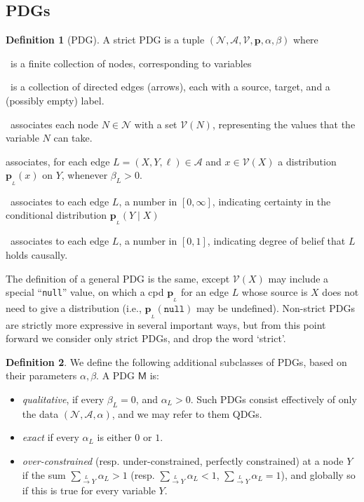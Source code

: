 \documentclass{article}
\newcommand{\bp}[1][L]{\mathbf{p}_{\!_#1\!}}
\newcommand{\V}{\mathcal V}
\newcommand{\N}{\mathcal N}
\newcommand{\Ed}{\mathcal A}
\newcommand{\dg}[1]{\mathsf #1}
\newcommand\mat[1]{\mathbf #1}
\theoremstyle{plain}
\theoremstyle{definition}
\newtheorem{defn}{Definition}
\theoremstyle{remark}
\begin{document}
\subsection{PDGs}
	\def\mnvars[#1]{(\N#1, \Ed#1, \V#1, \mat p#1, \alpha#1,\beta#1)}
	\begin{defn}[PDG]\label{def:model}
	A strict PDG is a tuple $\mnvars[]$ where
	\begin{description}[nosep]
		\item[$\N$]~is a finite collection of nodes, corresponding to variables
		\item[$\Ed$]~is a collection of directed edges (arrows), each with a source, target, and a (possibly empty) label.
		\item[$\V$]~associates each node $N \in \N$ with a set $\V(N)$,
		representing the values that the variable $N$ can take. 
		\item[$\mathbf p$] associates, for each edge $L = (X,Y, \ell) \in \Ed$ and $x \in \V(X)$ a distribution $\bp(x)$ on $Y$, whenever $\beta_L > 0$.
		\item[$\beta$]~associates to each edge $L$, a number in $[0,\infty]$, indicating certainty in the conditional distribution $\bp(Y \mid X)$ 
		\item[$\alpha$]~associates to each edge $L$, a number in $[0,1]$, indicating degree of belief that $L$ holds causally.
\end{description}
\end{defn}

The definition of a general PDG is the same, except $\mathcal V(X)$ may include a special ``\texttt{null}'' value, on which a cpd $\bp$ for an edge $L$ whose source is $X$ does not need to give a distribution (i.e., $\bp(\texttt{null})$ may be undefined). Non-strict PDGs are strictly more expressive in several important ways, but from this point forward we consider only strict PDGs, and drop the word `strict'.


\begin{defn}
	We define the following additional subclasses of PDGs, based on their parameters $\alpha, \beta$. A PDG $\dg M$ is:
	\begin{itemize}[nosep]
		\item \emph{qualitative}, if every $\beta_L = 0$, and $\alpha_L > 0$. Such PDGs consist effectively of only the data $(\N, \Ed, \alpha)$, and we may refer to them QDGs.
		\item \emph{exact} if every $\alpha_L$ is either $0$ or $1$.
		\item \emph{over-constrained} (resp. under-constrained, perfectly constrained) at a node $Y$ if the sum $\sum_{\overset{L}{\to}Y} \alpha_L > 1$ (resp. $\sum_{\overset{L}{\to}Y} \alpha_L < 1$, $\sum_{\overset{L}{\to}Y} \alpha_L =1$), and globally so if this is true for every variable $Y$.
	\end{itemize}
\end{defn}
\end{document}
